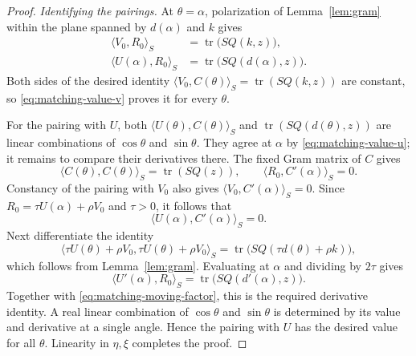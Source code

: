\begin{proof}
\smallskip
\noindent\emph{Identifying the pairings.}
At $\theta=\alpha$, polarization of Lemma~\ref{lem:gram} within the
plane spanned by $d(\alpha)$ and $k$ gives
\begin{align}
 \langle V_0,R_0\rangle_S
 &=\operatorname{tr}\bigl(SQ(k,z)\bigr),\label{eq:matching-value-v}\\
 \langle U(\alpha),R_0\rangle_S
 &=\operatorname{tr}\bigl(SQ(d(\alpha),z)\bigr).
 \label{eq:matching-value-u}
\end{align}
Both sides of the desired identity
$\langle V_0,C(\theta)\rangle_S=\operatorname{tr}(SQ(k,z))$
are constant, so \eqref{eq:matching-value-v} proves it for every
$\theta$.

For the pairing with $U$, both
$\langle U(\theta),C(\theta)\rangle_S$ and
$\operatorname{tr}(SQ(d(\theta),z))$ are linear combinations of
$\cos\theta$ and $\sin\theta$.  They agree at $\alpha$ by
\eqref{eq:matching-value-u}; it remains to compare their derivatives
there.  The fixed Gram matrix of $C$ gives
\[
 \langle C(\theta),C(\theta)\rangle_S
 =\operatorname{tr}(SQ(z)),
 \qquad
 \langle R_0,C'(\alpha)\rangle_S=0.
\]
Constancy of the pairing with $V_0$ also gives
$\langle V_0,C'(\alpha)\rangle_S=0$.  Since
$R_0=\tau U(\alpha)+\rho V_0$ and $\tau>0$, it follows that
\begin{equation}\label{eq:matching-moving-factor}
 \langle U(\alpha),C'(\alpha)\rangle_S=0.
\end{equation}
Next differentiate the identity
\[
 \langle\tau U(\theta)+\rho V_0,
          \tau U(\theta)+\rho V_0\rangle_S
 =\operatorname{tr}\bigl(SQ(\tau d(\theta)+\rho k)\bigr),
\]
which follows from Lemma~\ref{lem:gram}.  Evaluating at $\alpha$ and
dividing by $2\tau$ gives
\[
 \langle U'(\alpha),R_0\rangle_S
 =\operatorname{tr}\bigl(SQ(d'(\alpha),z)\bigr).
\]
Together with \eqref{eq:matching-moving-factor}, this is the required
derivative identity.  A real linear combination of $\cos\theta$ and
$\sin\theta$ is determined by its value and derivative at a single
angle.  Hence the pairing with $U$ has the desired value for all
$\theta$.  Linearity in $\eta,\xi$ completes the proof.
\end{proof}
